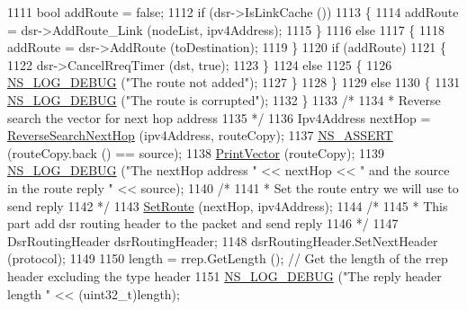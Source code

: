 \begin{DoxyCode}
1111           \textcolor{keywordtype}{bool} addRoute = \textcolor{keyword}{false};
1112           \textcolor{keywordflow}{if} (dsr->IsLinkCache ())
1113             \{
1114               addRoute = dsr->AddRoute\_Link (nodeList, ipv4Address);
1115             \}
1116           \textcolor{keywordflow}{else}
1117             \{
1118               addRoute = dsr->AddRoute (toDestination);
1119             \}
1120           \textcolor{keywordflow}{if} (addRoute)
1121             \{
1122               dsr->CancelRreqTimer (dst, \textcolor{keyword}{true});
1123             \}
1124           \textcolor{keywordflow}{else}
1125             \{
1126               \hyperlink{group__logging_ga413f1886406d49f59a6a0a89b77b4d0a}{NS\_LOG\_DEBUG} (\textcolor{stringliteral}{"The route not added"});
1127             \}
1128         \}
1129       \textcolor{keywordflow}{else}
1130         \{
1131           \hyperlink{group__logging_ga413f1886406d49f59a6a0a89b77b4d0a}{NS\_LOG\_DEBUG} (\textcolor{stringliteral}{"The route is corrupted"});
1132         \}
1133       \textcolor{comment}{/*}
1134 \textcolor{comment}{       * Reverse search the vector for next hop address}
1135 \textcolor{comment}{       */}
1136       Ipv4Address nextHop = \hyperlink{classns3_1_1dsr_1_1DsrOptions_a9cc1c0bdf1b57f8b2eea4d9070b26a58}{ReverseSearchNextHop} (ipv4Address, routeCopy);
1137       \hyperlink{assert_8h_a6dccdb0de9b252f60088ce281c49d052}{NS\_ASSERT} (routeCopy.back () == source);
1138       \hyperlink{classns3_1_1dsr_1_1DsrOptions_a44ae8e58769880ec9c0150bb28652350}{PrintVector} (routeCopy);
1139       \hyperlink{group__logging_ga413f1886406d49f59a6a0a89b77b4d0a}{NS\_LOG\_DEBUG} (\textcolor{stringliteral}{"The nextHop address "} << nextHop << \textcolor{stringliteral}{" and the source in the route reply "} 
      << source);
1140       \textcolor{comment}{/*}
1141 \textcolor{comment}{       * Set the route entry we will use to send reply}
1142 \textcolor{comment}{       */}
1143       \hyperlink{classns3_1_1dsr_1_1DsrOptions_af749b76db4626ae64bc37001a5353b99}{SetRoute} (nextHop, ipv4Address);
1144       \textcolor{comment}{/*}
1145 \textcolor{comment}{       * This part add dsr routing header to the packet and send reply}
1146 \textcolor{comment}{       */}
1147       DsrRoutingHeader dsrRoutingHeader;
1148       dsrRoutingHeader.SetNextHeader (protocol);
1149 
1150       length = rrep.GetLength ();    \textcolor{comment}{// Get the length of the rrep header excluding the type header}
1151       \hyperlink{group__logging_ga413f1886406d49f59a6a0a89b77b4d0a}{NS\_LOG\_DEBUG} (\textcolor{stringliteral}{"The reply header length "} << (uint32\_t)length);

\end{DoxyCode}
